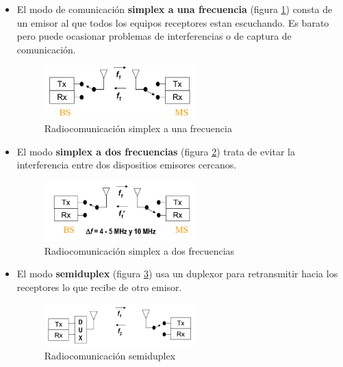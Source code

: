 \begin{itemize}
\item El modo de comunicación \textbf{simplex a una frecuencia}  (figura \ref{fig:simplex1}) consta de un emisor al que todos los equipos receptores estan escuchando. Es barato pero puede ocasionar problemas de interferencias o de captura de comunicación.

\begin{figure}[H]
\centering
\includegraphics[width=0.55\textwidth]{figuras/RadioSimplex1.png}
\caption{Radiocomunicación simplex a una frecuencia}
\label{fig:simplex1}
\end{figure}

\item El modo \textbf{simplex a dos frecuencias} (figura \ref{fig:simplex2}) trata de evitar la interferencia entre dos dispositios emisores cercanos.

\begin{figure}[H]
\centering
\includegraphics[width=0.55\textwidth]{figuras/RadioSimplex2.png}
\caption{Radiocomunicación simplex a dos frecuencias}
\label{fig:simplex2}
\end{figure}

\item El modo \textbf{semiduplex}  (figura \ref{fig:semiduplex}) usa un duplexor para retransmitir hacia los receptores lo que recibe de otro emisor.

\begin{figure}[H]
\centering
\includegraphics[width=0.55\textwidth]{figuras/RadioSemiduplex.png}
\caption{Radiocomunicación semiduplex}
\label{fig:semiduplex}
\end{figure}


\end{itemize}
